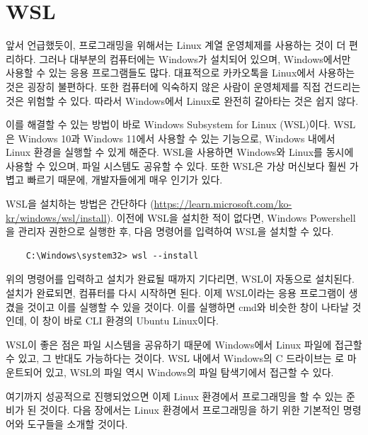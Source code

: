 \section{WSL}
앞서 언급했듯이, 프로그래밍을 위해서는 Linux 계열 운영체제를 사용하는 것이 더 편리하다. 그러나 대부분의 컴퓨터에는 Windows가 설치되어 있으며, Windows에서만 사용할 수 있는 응용 프로그램들도 많다. 대표적으로 카카오톡을 Linux에서 사용하는 것은 굉장히 불편하다. 또한 컴퓨터에 익숙하지 않은 사람이 운영체제를 직접 건드리는 것은 위험할 수 있다. 따라서 Windows에서 Linux로 완전히 갈아타는 것은 쉽지 않다.

이를 해결할 수 있는 방법이 바로 Windows Subsystem for Linux (WSL)이다. WSL은 Windows 10과 Windows 11에서 사용할 수 있는 기능으로, Windows 내에서 Linux 환경을 실행할 수 있게 해준다. WSL을 사용하면 Windows와 Linux를 동시에 사용할 수 있으며, 파일 시스템도 공유할 수 있다. 또한 WSL은 가상 머신보다 훨씬 가볍고 빠르기 때문에, 개발자들에게 매우 인기가 있다.

WSL을 설치하는 방법은 간단하다 (\href{https://learn.microsoft.com/ko-kr/windows/wsl/install}{https://learn.microsoft.com/ko-kr/windows/wsl/install}). 이전에 WSL을 설치한 적이 없다면, Windows Powershell을 관리자 권한으로 실행한 후, 다음 명령어를 입력하여 WSL을 설치할 수 있다.

\begin{lstlisting}
    C:\Windows\system32> wsl --install
\end{lstlisting}

위의 명령어를 입력하고 설치가 완료될 때까지 기다리면, WSL이 자동으로 설치된다. 설치가 완료되면, 컴퓨터를 다시 시작하면 된다. 이제 WSL이라는 응용 프로그램이 생겼을 것이고 이를 실행할 수 있을 것이다. 이를 실행하면 cmd와 비슷한 창이 나타날 것인데, 이 창이 바로 CLI 환경의 Ubuntu Linux이다.

WSL이 좋은 점은 파일 시스템을 공유하기 때문에 Windows에서 Linux 파일에 접근할 수 있고, 그 반대도 가능하다는 것이다. WSL 내에서 Windows의 C 드라이브는 로 마운트되어 있고, WSL의 파일 역시 Windows의 파일 탐색기에서 접근할 수 있다.

여기까지 성공적으로 진행되었으면 이제 Linux 환경에서 프로그래밍을 할 수 있는 준비가 된 것이다. 다음 장에서는 Linux 환경에서 프로그래밍을 하기 위한 기본적인 명령어와 도구들을 소개할 것이다.



